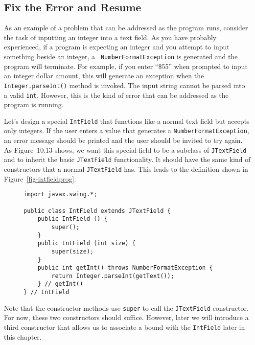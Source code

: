 \subsection{Fix the Error and Resume}
\noindent As an example of a problem that can be addressed as the
program runs, consider the task of inputting an integer into a text
field.  As you have probably experienced, if a program is expecting an
integer and you attempt to input something beside an integer, a {\tt
NumberFormatException} is generated and the program will terminate.
For example, if you enter ``\$55'' when prompted to input an integer
dollar amount, this will generate an exception when the {\tt
Integer.parseInt()} method is invoked.  The input string cannot be
parsed into a valid {\tt int}.  However, this is the kind of error
that can be addressed as the program is running.

Let's design a special {\tt IntField} that functions like a normal
text field but accepts only integers.  If the user enters a value that
generates a {\tt NumberFormatException}, an error message should be
printed and the user should be invited to try again.  As
Figure~10.13 shows, we want this special field to be a subclass of
{\tt JTextField} and to inherit the basic {\tt JTextField}
functionality.  It should have the same kind of constructors that a
normal {\tt JTextField} has.  This leads to the definition shown in
Figure~\ref{fig-intfieldprog}.

\begin{figure}[htb]
\jjjprogstart
\begin{jjjlisting}
\begin{lstlisting}
import javax.swing.*;

public class IntField extends JTextField {
    public IntField () {
        super();
    }
    public IntField (int size) {
        super(size);
    }
    public int getInt() throws NumberFormatException {
        return Integer.parseInt(getText());
    } // getInt()
} // IntField
\end{lstlisting}
\end{jjjlisting}
\end{figure}

Note that the constructor methods use {\tt super} to call the
{\tt JTextField} constructor.  For now, these two constructors should
  suffice.  However, later
we will introduce a third constructor that allows us to associate a
bound with the {\tt IntField} later in this chapter.

